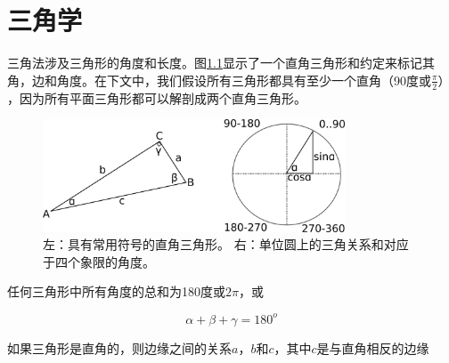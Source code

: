 
\chapter{三角学}
三角法涉及三角形的角度和长度。图\ref{fig:triangle}显示了一个直角三角形和约定来标记其角，边和角度。在下文中，我们假设所有三角形都具有至少一个直角（90度或$\frac{\pi}{2}）$，因为所有平面三角形都可以解剖成两个直角三角形。

\begin{figure}[!htb]
\centering
\includegraphics[width=0.8\textwidth]{figs/triangle}
\caption{左：具有常用符号的直角三角形。 右：单位圆上的三角关系和对应于四个象限的角度。}
\label{fig:triangle}
\end{figure}


任何三角形中所有角度的总和为180度或$2\pi$，或

\begin{equation}
\alpha + \beta + \gamma = 180^o
\end{equation}


如果三角形是直角的，则边缘之间的关系$a$，$b$和$c$，其中$c$是与直角相反的边缘

